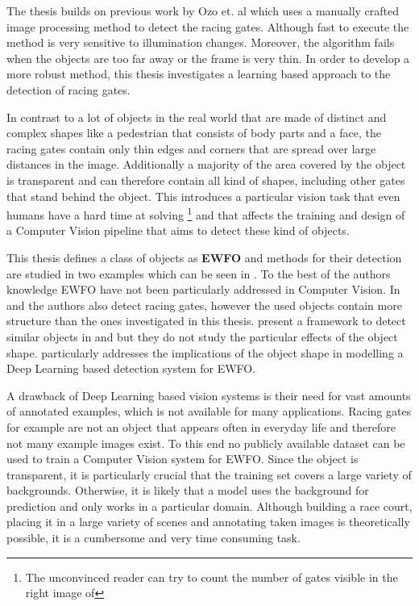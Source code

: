 The thesis builds on previous work by Ozo et. al  which uses a manually crafted image processing method to detect the racing gates. Although fast to execute the method is very sensitive to illumination changes. Moreover, the algorithm fails when the objects are too far away or the frame is very thin. In order to develop a more robust method, this thesis investigates a learning based approach to the detection of racing gates.

In contrast to a lot of objects in the real world that are made of distinct and complex shapes like a pedestrian that consists of body parts and a face, the racing gates contain only thin edges and corners that are spread over large distances in the image. Additionally a majority of the area covered by the object is transparent and can therefore contain all kind of shapes, including other gates that stand behind the object. This introduces a particular vision task that even humans have a hard time at solving \footnote{The unconvinced reader can try to count the number of gates visible in the right image of } and that affects the training and design of a Computer Vision pipeline that aims to detect these kind of objects.

This thesis defines a class of objects as \textbf{\ac{EWFO}} and methods for their detection are studied in two examples which can be seen in  . To the best of the authors knowledge \ac{EWFO} have not been particularly addressed in Computer Vision. In \cite{Falanga} and \cite{Li2018a} the authors also detect racing gates, however the used objects contain more structure than the ones investigated in this thesis. \citeauthor{Jung2018} present a framework to detect similar objects in \cite{Jung} and \cite{Jung2018} but they do not study the particular effects of the object shape.  particularly addresses the implications of the object shape in modelling a Deep Learning based detection system for \ac{EWFO}.

A drawback of Deep Learning based vision systems is their need for vast amounts of annotated examples, which is not available for many applications. Racing gates for example are not an object that appears often in everyday life and therefore not many example images exist. To this end no publicly available dataset can be used to train a Computer Vision system for \ac{EWFO}. Since the object is transparent, it is particularly crucial that the training set covers a large variety of backgrounds. Otherwise, it is likely that a model uses the background for prediction and only works in a particular domain. Although building a race court, placing it in a large variety of scenes and annotating taken images is theoretically possible, it is a cumbersome and very time consuming task. 

